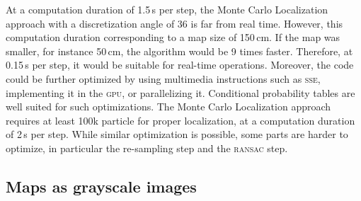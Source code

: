 \documentclass[letterpaper, 10pt, conference]{ieeeconf}
\begin{document}
At a computation duration of 1.5\,s per step, the Monte Carlo Localization approach with a discretization angle of 36 is far from real time.
However, this computation duration corresponding to a map size of 150\,cm.
If the map was smaller, for instance 50\,cm, the algorithm would be 9 times faster.
Therefore, at 0.15\,s per step, it would be suitable for real-time operations.
Moreover, the code could be further optimized by using multimedia instructions such as \textsc{sse}, implementing it in the \textsc{gpu}, or parallelizing it.
Conditional probability tables are well suited for such optimizations.
The Monte Carlo Localization approach requires at least 100k particle for proper localization, at a computation duration of 2\,s per step.
While similar optimization is possible, some parts are harder to optimize, in particular the re-sampling step and the \textsc{ransac} step.

\subsection{Maps as grayscale images}
\end{document}
